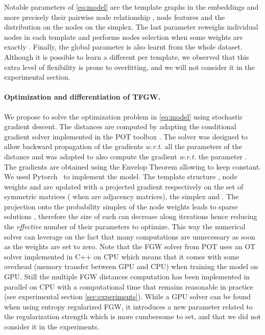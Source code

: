 \documentclass{article}
\begin{document}
Notable parameters of \eqref{eq:model} are the template graphs in the embeddings  and more precisely
their pairwise node relationship , node features
 and the distribution on the nodes
 on the simplex. The last parameter
reweighs individual nodes in each template and performs nodes selection
when some weights are exactly  \cite{vincent2021online, vincent-cuaz2022semirelaxed}. Finally, the global parameter 
is also learnt from the whole dataset.
Although it is possible to learn a different  per template, we observed that this extra level of flexibility is prone to overfitting, and we will not consider it in the experimental section.





 
\paragraph{Optimization and differentiation of TFGW.} 
We propose to solve the optimization problem in \eqref{eq:model} using stochastic
gradient descent. The  distances are
computed by adapting the conditional gradient solver implemented in the POT
toolbox \cite{flamary2021pot}.
The solver was designed to allow backward propagation of the gradients \textit{w.r.t.}
all the parameters of the distance and was adapted to also compute the gradient
\emph{w.r.t.} the parameter . The gradients are obtained using the
Envelop Theorem \cite{afriat1971theory} allowing to keep  constant.
We used Pytorch~\cite{paszke2017automatic} to implement the model. 
The template structure , node weights  and  are updated with a projected gradient respectively on the set of 
symmetric matrices  (
when  are adjacency matrices), the simplex  and .
The projection onto the probability simplex of the node weights leads to sparse solutions \cite{condat2016fast}, therefore
the size of each  can decrease along iterations hence reducing the \emph{effective} 
number of their parameters to optimize. This way the numerical solver can leverage on the fact that many computations are unnecessary as soon as the weights are set to zero. Note that the FGW solver from POT uses an OT
solver implemented in C++ on CPU which means that it comes with some overhead (memory
transfer between GPU and CPU) when training the model on GPU. Still the multiple FGW distances computation has been
implemented in parallel on CPU with a computational time that remains reasonable in
practice (see experimental section \ref{sec:experiments}). While a GPU solver can be found when using entropy regularized FGW, it introduces a new parameter related to the regularization strength which is more cumbersome to set, and that we did not consider it in the experiments.
\end{document}
